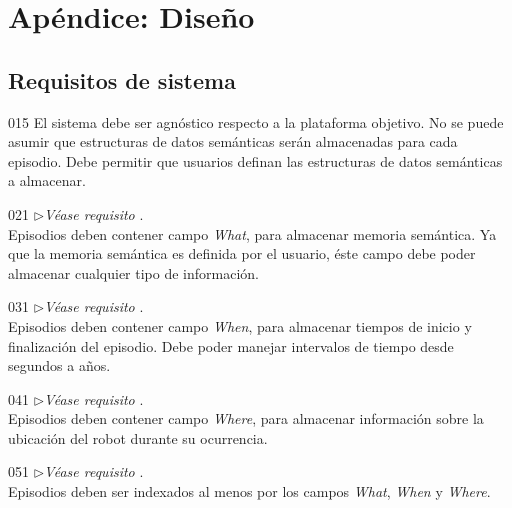 \chapter{Apéndice: Diseño}\label{chapter:appendix_a}

\section{Requisitos de sistema}\label{appendix:req-sistema}

\newenvironment{requisito-sistema}[2]
{
	\noindent{\bfseries Requisito \RSlabel{#1}}
	\hfill\textit{(Derivado de }\RPlabel{#2})\\
}{}
\newcommand{\RSlinkStachowicz}[1]{$\triangleright$\textit{Véase requisito }\RStachowicz{#1}.\\}

\begin{requisito-sistema}{01}{5}
	El sistema debe ser agnóstico respecto a la plataforma objetivo. No se puede asumir que estructuras de datos semánticas serán almacenadas para cada episodio. Debe permitir que usuarios definan las estructuras de datos semánticas a almacenar.
\end{requisito-sistema}

\begin{requisito-sistema}{02}{1}
	\RSlinkStachowicz{1}
	Episodios deben contener campo \textit{What}, para almacenar memoria semántica. Ya que la memoria semántica es definida por el usuario, éste campo debe poder almacenar cualquier tipo de información.	
\end{requisito-sistema}

\begin{requisito-sistema}{03}{1}
	\RSlinkStachowicz{1}
	Episodios deben contener campo \textit{When}, para almacenar tiempos de inicio y finalización del episodio. Debe poder manejar intervalos de tiempo desde segundos a años.	
\end{requisito-sistema}

\begin{requisito-sistema}{04}{1}
	\RSlinkStachowicz{1}
	Episodios deben contener campo \textit{Where}, para almacenar información sobre la ubicación del robot durante su ocurrencia.	
\end{requisito-sistema}

\begin{requisito-sistema}{05}{1}
	\RSlinkStachowicz{2}
	Episodios deben ser indexados al menos por los campos \textit{What}, \textit{When} y \textit{Where}.
\end{requisito-sistema}

